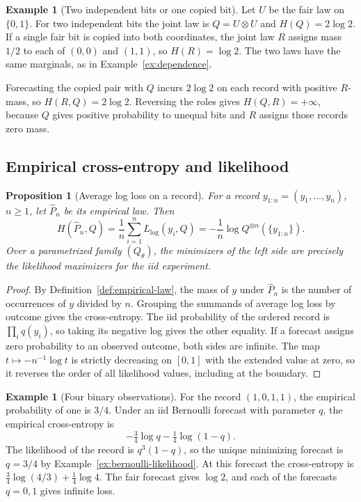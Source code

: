 \documentclass[11pt,oneside]{book}
\newtheorem{proposition}[theorem]{Proposition}
\theoremstyle{definition}
\newtheorem{example}[theorem]{Example}
\theoremstyle{remark}
\begin{document}
\begin{example}[Two independent bits or one copied bit]
\label{ex:entropy-copied-bit}
Let $U$ be the fair law on $\{0,1\}$. For two independent bits the joint
law is $Q=U\otimes U$ and $H(Q)=2\log 2$. If a single fair bit is
copied into both coordinates, the joint law $R$ assigns mass $1/2$
to each of $(0,0)$ and $(1,1)$, so $H(R)=\log 2$. The two laws have
the same marginals, as in Example~\ref{ex:dependence}.

Forecasting the copied pair with $Q$ incurs $2\log 2$ on each record
with positive $R$-mass, so $H(R,Q)=2\log 2$. Reversing the roles gives
$H(Q,R)=+\infty$, because $Q$ gives positive probability to unequal
bits and $R$ assigns those records zero mass.
\end{example}

\subsection{Empirical cross-entropy and likelihood}
\label{subsec:empirical-cross-entropy}

\begin{proposition}[Average log loss on a record]
\label{prop:empirical-cross-entropy}
For a record $y_{1:n}=(y_1,\ldots,y_n)$, $n\geq1$, let
$\widehat P_n$ be its empirical law. Then
\begin{equation}
H(\widehat P_n,Q)
=\frac1n\sum_{i=1}^n L_{\log}(y_i,Q)
=-\frac1n\log Q^{\otimes n}(\{y_{1:n}\}).
\label{eq:empirical-cross-entropy-likelihood}
\end{equation}
Over a parametrized family $(Q_\theta)$, the minimizers of the left
side are precisely the likelihood maximizers for the iid experiment.
\end{proposition}
\begin{proof}
By Definition~\ref{def:empirical-law}, the mass of $y$ under
$\widehat P_n$ is the number of occurrences of $y$ divided by $n$.
Grouping the summands of average log loss by outcome gives the
cross-entropy. The iid probability of the ordered record is
$\prod_i q(y_i)$, so taking its negative log gives the other equality.
If a forecast assigns zero probability to an observed outcome, both
sides are infinite. The map $t\mapsto -n^{-1}\log t$ is strictly
decreasing on $[0,1]$ with the extended value at zero, so it reverses
the order of all likelihood values, including at the boundary.
\end{proof}

\begin{example}[Four binary observations]
\label{ex:empirical-binary-cross-entropy}
For the record $(1,0,1,1)$, the empirical probability of one is $3/4$.
Under an iid Bernoulli forecast with parameter $q$, the empirical
cross-entropy is
\[
-\tfrac34\log q-\tfrac14\log(1-q).
\]
The likelihood of the record is $q^3(1-q)$, so the unique minimizing
forecast is $q=3/4$ by Example~\ref{ex:bernoulli-likelihood}.
At this forecast the cross-entropy is
$\tfrac34\log(4/3)+\tfrac14\log 4$. The fair forecast gives $\log 2$,
and each of the forecasts $q=0,1$ gives infinite loss.
\end{example}
\end{document}
